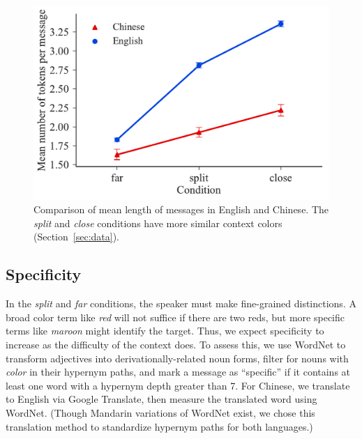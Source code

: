 \documentclass[11pt,a4paper]{article}
\renewcommand{\|}{\mid}
\newcommand{\word}[1]{\emph{#1}}
\newcommand{\secref}[1]{Section~\ref{#1}}
\begin{document}
\begin{figure}[!t]
    \centering

    \includegraphics[width=0.8\columnwidth]{tokens.pdf}
\caption{Comparison of mean length of messages in English and Chinese. The \emph{split} and \emph{close} conditions have more similar context colors (\secref{sec:data}).}
\label{fig:length}
\end{figure}




\subsection{Specificity}

In the \emph{split} and \emph{far} conditions, the speaker must make fine-grained distinctions. A broad color term like \word{red} will not suffice if there are two reds, but more specific terms like \word{maroon} might identify the target. Thus, we expect specificity to increase as the difficulty of the context does. To assess this, we use WordNet \citep{WordNet98} to transform adjectives into derivationally-related noun forms, filter for nouns with \word{color} in their hypernym paths, and mark a message as ``specific'' if it contains at least one word with a hypernym depth greater than 7. For Chinese, we translate to English via Google Translate, then measure the translated word using WordNet. (Though Mandarin variations of WordNet exist, we chose this translation method to standardize hypernym paths for both languages.)
\end{document}
